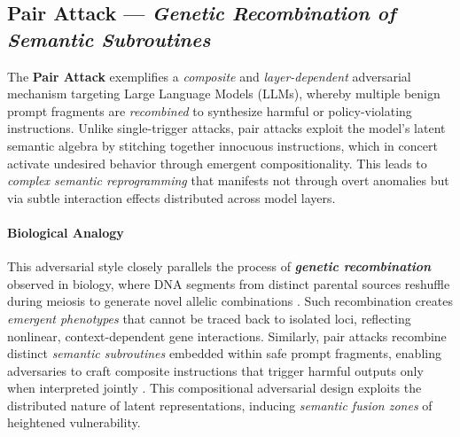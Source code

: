 
\subsection{\textbf{Pair Attack} — \textit{Genetic Recombination of Semantic Subroutines}}

The \textbf{Pair Attack} exemplifies a \emph{composite} and \emph{layer-dependent} adversarial mechanism targeting Large Language Models (LLMs), whereby multiple benign prompt fragments are \emph{recombined} to synthesize harmful or policy-violating instructions. Unlike single-trigger attacks, pair attacks exploit the model’s latent semantic algebra by stitching together innocuous instructions, which in concert activate undesired behavior through emergent compositionality. This leads to \emph{complex semantic reprogramming} that manifests not through overt anomalies but via subtle interaction effects distributed across model layers.

\paragraph{Biological Analogy}  
This adversarial style closely parallels the process of \textbf{\emph{genetic recombination}} observed in biology, where DNA segments from distinct parental sources reshuffle during meiosis to generate novel allelic combinations \citep{muller2020meiosis}. Such recombination creates \emph{emergent phenotypes} that cannot be traced back to isolated loci, reflecting nonlinear, context-dependent gene interactions. Similarly, pair attacks recombine distinct \emph{semantic subroutines} embedded within safe prompt fragments, enabling adversaries to craft composite instructions that trigger harmful outputs only when interpreted jointly \citep{carlini2021extracting}. This compositional adversarial design exploits the distributed nature of latent representations, inducing \emph{semantic fusion zones} of heightened vulnerability.

















